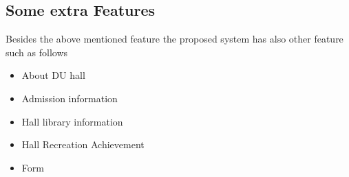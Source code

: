 \subsection{Some extra Features} Besides the above mentioned
feature the proposed system has also other feature such as follows

\begin{itemize}\item{About DU hall}
\item{ Admission information} \item{ Hall library information}

\item{Hall Recreation Achievement} \item{Form}
\end{itemize}
